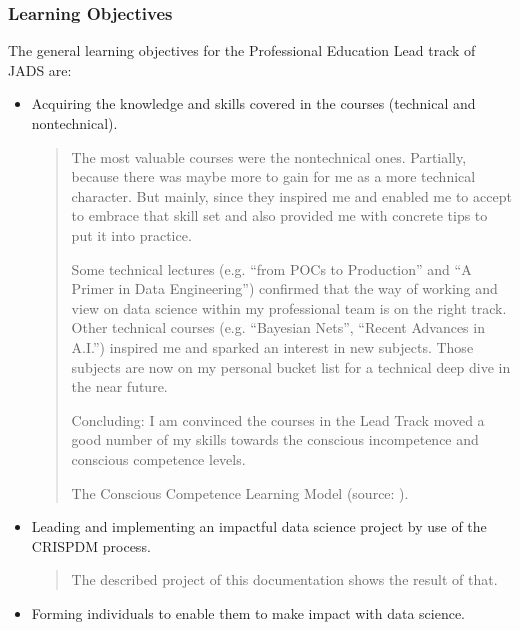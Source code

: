 \documentclass[letterpaper,10pt,english]{sphinxmanual}
\let\sphinxpxdimen\pdfpxdimen\else\newdimen\sphinxpxdimen
\begin{document}
\subsubsection{Learning Objectives}
\label{\detokenize{deployment:learning-objectives}}
The general learning objectives for the Professional Education Lead track of JADS are:
\begin{itemize}
\item {} 
Acquiring the knowledge and skills covered in the courses (technical and non\sphinxhyphen{}technical).
\begin{quote}

The most valuable courses were the non\sphinxhyphen{}technical ones.
Partially, because there was maybe more to gain for me as a more technical character.
But mainly, since they inspired me and enabled me to accept to embrace that skill set and also provided me with concrete tips to put it into practice.

Some technical lectures (e.g. “from POCs to Production” and “A Primer in Data Engineering”) confirmed that the way of working and view on data science within my professional team is on the right track.
Other technical courses (e.g. “Bayesian Nets”, “Recent Advances in A.I.”) inspired me and sparked an interest in new subjects.
Those subjects are now on my personal bucket list for a technical deep dive in the near future.

Concluding: I am convinced the courses in the Lead Track moved a good number of my skills towards the conscious incompetence and conscious competence levels.
\begin{quote}

\noindent{\hspace*{\fill}\sphinxincludegraphics[width=800\sphinxpxdimen]{{competence}.png}\hspace*{\fill}}
\end{quote}

The Conscious Competence Learning Model (source: ).
\end{quote}

\item {} 
Leading and implementing an impactful data science project by use of the CRISP\sphinxhyphen{}DM process.
\begin{quote}

The described project of this documentation shows the result of that.
\end{quote}

\item {} 
Forming individuals to enable them to make impact with data science.
\begin{quote}


\end{quote}
\end{itemize}
\end{document}
